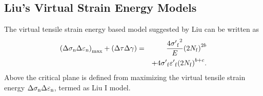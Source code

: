 \documentclass[preprint,5p,twocolumn,11pt,sort&compress]{elsarticle}
\begin{document}
\subsection{Liu's Virtual Strain Energy Models}
The virtual tensile strain energy based model suggested by Liu \cite{Liu1993} can be written as
\begin{eqnarray}
{\left( {\Delta {\sigma _{\rm n}}\Delta {\varepsilon _{\rm n}}} \right)_{\max }} + \left( {\Delta \tau \Delta \gamma } \right) &=& \frac{{4{{\sigma '}_{\rm f}}^2}}{E}{\left( {2{N_{\rm f}}} \right)^{2b}}
\\
& & + 4{{\sigma '}_{\rm f}}{{\varepsilon '}_{\rm f}}{\left( {2{N_{\rm f}}} \right)^{b + c}}.
\end{eqnarray}
Above the critical plane is defined from maximizing the virtual tensile strain energy ${\Delta {\sigma _{\rm n}}\Delta {\varepsilon _{\rm n}}}$, termed as Liu I model. 
\end{document}
